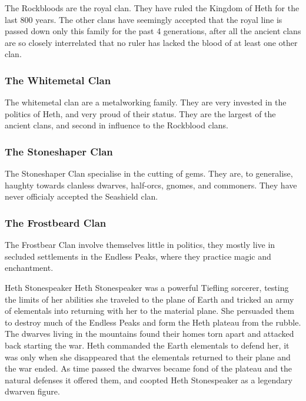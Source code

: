 \documentclass[10pt,twoside,twocolumn,openany,justified,bg=full,nomultitoc]{dndbook}
\begin{document}
The Rockbloods are the royal clan. They have ruled the Kingdom of Heth for the last 800 years. The other clans have seemingly accepted that the royal line is passed down only this family for the past 4 generations, after all the ancient clans are so closely interrelated that no ruler has lacked the blood of at least one other clan.
\subsubsection{The Whitemetal Clan}
\label{sec-2-2-1-2}
The whitemetal clan are a metalworking family. They are very invested in the politics of Heth, and very proud of their status. They are the largest of the ancient clans, and second in influence to the Rockblood clans.

\subsubsection{The Stoneshaper Clan}
\label{sec-2-2-1-3}
The Stoneshaper Clan specialise in the cutting of gems. They are, to generalise, haughty towards clanless dwarves, half-orcs, gnomes, and commoners. They have never officialy accepted the Seashield clan.

\subsubsection{The Frostbeard Clan}
\label{sec-2-2-1-4}
The Frostbear Clan involve themselves little in politics, they mostly live in secluded settlements in the Endless Peaks, where they practice magic and enchantment.

\begin{paperbox}[float=!t]{Heth Stonespeaker}\label{Heth-Stonespeaker}
Heth Stonespeaker was a powerful Tiefling sorcerer, testing the limits of her abilities she traveled to the plane of Earth and tricked an army of elementals into returning with her to the material plane. She persuaded them to destroy much of the Endless Peaks and form the Heth plateau from the rubble. The dwarves living in the mountains found their homes torn apart and attacked back starting the war. Heth commanded the Earth elementals to defend her, it was only when she disappeared that the elementals returned to their plane and the war ended. As time passed the dwarves became fond of the plateau and the natural defenses it offered them, and coopted Heth Stonespeaker as a legendary dwarven figure.
\end{paperbox}
\end{document}
